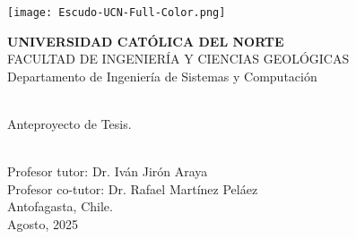 \thispagestyle{empty}
\begin{center}
    \texttt{[image: Escudo-UCN-Full-Color.png]}\\
    \vspace{1cm}
    \begin{large}
        \textbf{UNIVERSIDAD CATÓLICA DEL NORTE}\\
        \vspace{0.3cm}
        FACULTAD DE INGENIERÍA Y CIENCIAS GEOLÓGICAS\\
        \vspace{0.3cm}
        Departamento de Ingeniería de Sistemas y Computación\\
        \vspace{2cm}
    \end{large}
    \begin{large}
        \textbf{\MakeUppercase{\newtitle}}\\
        \vspace{0.1cm}
       Anteproyecto de Tesis.\\
        \vspace{1.5cm}
    \end{large}
    \begin{large}
 
        \textbf{\MakeUppercase{\newauthor}}\\
        \vspace{1cm}
        Profesor tutor: Dr. Iván Jirón Araya\\ %
        \vspace{0.1cm}
        Profesor co-tutor: Dr. Rafael Martínez Peláez\\ %
        \vspace{1cm}
        Antofagasta, Chile.\\
        Agosto, 2025 %
    \end{large}
\end{center}
